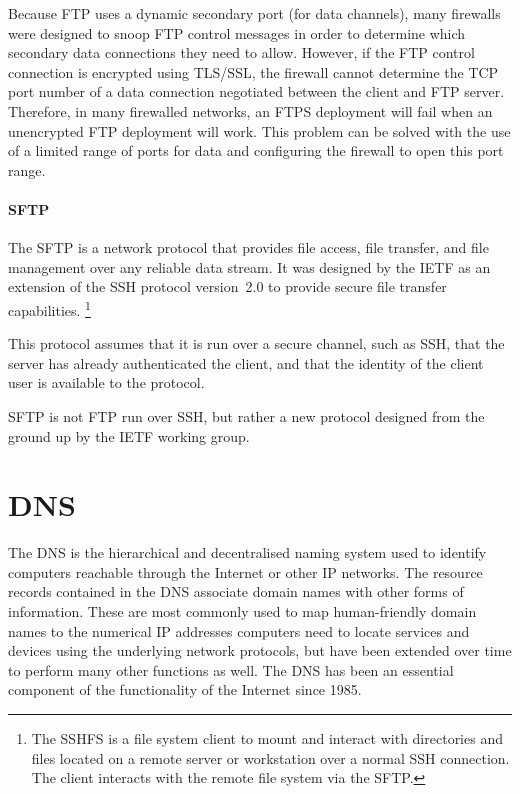 Because \acs{FTP} uses a dynamic secondary port (for data channels), many firewalls were designed to snoop \acs{FTP} control messages in order to determine which secondary data connections they need to allow.
However, if the \acs{FTP} control connection is encrypted using \acs{TLS}/\acs{SSL}, the firewall cannot determine the \acs{TCP} port number of a data connection negotiated between the client and \acs{FTP} server.
Therefore, in many firewalled networks, an \acs{FTPS} deployment will fail when an unencrypted \acs{FTP} deployment will work.
This problem can be solved with the use of a limited range of ports for data and configuring the firewall to open this port range.

\paragraph{\acs{SFTP}}
The \acl{SFTP} is a network protocol that provides file access, file transfer, and file management over any reliable data stream.
It was designed by the \acs{IETF} as an extension of the \acf{SSH} protocol version~2.0 to provide secure file transfer capabilities.%
   \footnote{%
   The \acf{SSHFS} is a file system client to mount and interact with directories and files located on a remote server or workstation over a normal \acs{SSH} connection.
   The client interacts with the remote file system via the \acf{SFTP}.
   }

This protocol assumes that it is run over a secure channel, such as \acs{SSH}, that the server has already authenticated the client, and that the identity of the client user is available to the protocol.

\acs{SFTP} is not \acs{FTP} run over \acs{SSH}, but rather a new protocol designed from the ground up by the \acs{IETF}  working group.


\section{\acl{DNS}}
The \acf{DNS} is the hierarchical and decentralised naming system used to identify computers reachable through the Internet or other \acs{IP} networks.
The resource records contained in the \acs{DNS} associate domain names with other forms of information.
These are most commonly used to map human-friendly domain names to the numerical \acs{IP} addresses computers need to locate services and devices using the underlying network protocols, but have been extended over time to perform many other functions as well.
The \acl{DNS} has been an essential component of the functionality of the Internet since 1985.



